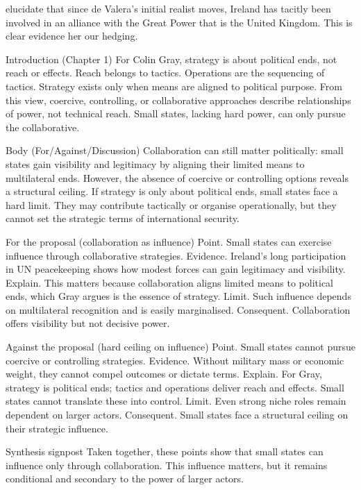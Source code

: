 \parencite{FANNING_2015,AYIOTIS_2023} elucidate that since de Valera's initial realist moves, Ireland has tacitly been involved in an alliance with the Great Power that is the United Kingdom.  This is clear evidence her our hedging.      

Introduction (Chapter 1)
For Colin Gray, strategy is about political ends, not reach or effects. Reach belongs to tactics. Operations are the sequencing of tactics. Strategy exists only when means are aligned to political purpose. From this view, coercive, controlling, or collaborative approaches describe relationships of power, not technical reach. Small states, lacking hard power, can only pursue the collaborative.

Body (For/Against/Discussion)
Collaboration can still matter politically: small states gain visibility and legitimacy by aligning their limited means to multilateral ends. However, the absence of coercive or controlling options reveals a structural ceiling. If strategy is only about political ends, small states face a hard limit. They may contribute tactically or organise operationally, but they cannot set the strategic terms of international security.

For the proposal (collaboration as influence)
Point. Small states can exercise influence through collaborative strategies.
Evidence. Ireland’s long participation in UN peacekeeping shows how modest forces can gain legitimacy and visibility.
Explain. This matters because collaboration aligns limited means to political ends, which Gray argues is the essence of strategy.
Limit. Such influence depends on multilateral recognition and is easily marginalised.
Consequent. Collaboration offers visibility but not decisive power.

Against the proposal (hard ceiling on influence)
Point. Small states cannot pursue coercive or controlling strategies.
Evidence. Without military mass or economic weight, they cannot compel outcomes or dictate terms.
Explain. For Gray, strategy is political ends; tactics and operations deliver reach and effects. Small states cannot translate these into control.
Limit. Even strong niche roles remain dependent on larger actors.
Consequent. Small states face a structural ceiling on their strategic influence.

Synthesis signpost
Taken together, these points show that small states can influence only through collaboration. This influence matters, but it remains conditional and secondary to the power of larger actors.
                                                                                                                                                  